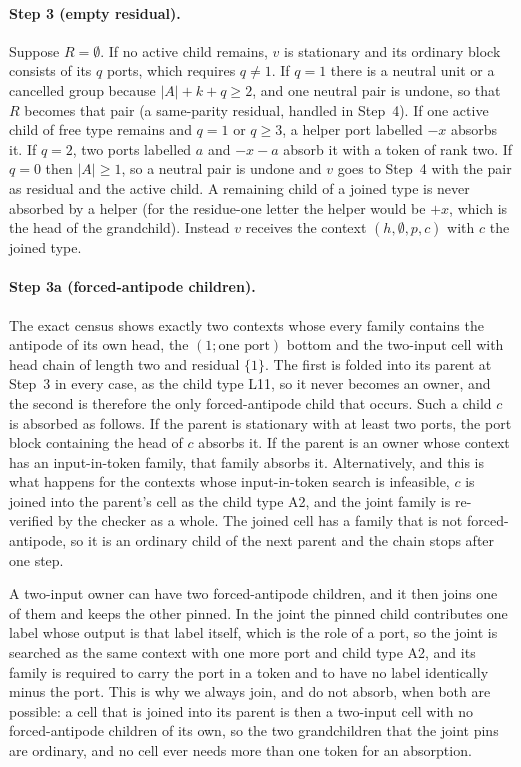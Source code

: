 \documentclass[11pt,a4paper]{article}
\theoremstyle{plain}
\theoremstyle{definition}
\theoremstyle{remark}
\begin{document}
\paragraph{Step 3 (empty residual).}
Suppose $R=\emptyset$.  If no active child remains, $v$ is stationary and its
ordinary block consists of its $q$ ports, which requires $q\ne 1$.  If $q=1$
there is a neutral unit or a cancelled group because $|A|+k+q\ge 2$, and one
neutral pair is undone, so that $R$ becomes that pair (a same-parity
residual, handled in Step~4).  If one active child of free type remains and
$q=1$ or $q\ge 3$, a helper port labelled $-x$ absorbs it.  If $q=2$, two ports
labelled $a$ and $-x-a$ absorb it with a token of rank two.  If $q=0$ then
$|A|\ge 1$, so a neutral pair is undone and $v$ goes to Step~4 with the pair as
residual and the active child.  A remaining child of a joined type is never
absorbed by a helper (for the residue-one letter the helper would be $+x$,
which is the head of the grandchild).  Instead $v$ receives the context
$(h,\emptyset,p,c)$ with $c$ the joined type.

\paragraph{Step 3a (forced-antipode children).}
The exact census shows exactly two contexts whose every family contains the
antipode of its own head, the $(1;\text{one port})$ bottom and the two-input
cell with head chain of length two and residual $\{1\}$.  The first is folded
into its parent at Step~3 in every case, as the child type L11, so it never
becomes an owner, and the second is therefore the only forced-antipode child
that occurs.  Such a child $c$ is absorbed as follows.  If the parent is
stationary with at least two ports, the port block containing the head of $c$
absorbs it.  If the parent is an owner whose context has an input-in-token
family, that family absorbs it.  Alternatively, and this is what happens for
the contexts whose input-in-token search is infeasible, $c$ is joined into the
parent's cell as the child type A2, and the joint family is re-verified by the
checker as a whole.  The joined cell has a family that is not forced-antipode, so it
is an ordinary child of the next parent and the chain stops after one step.

A two-input owner can have two forced-antipode children, and it then joins one
of them and keeps the other pinned.  In the joint the pinned child contributes
one label whose output is that label itself, which is the role of a port, so
the joint is searched as the same context with one more port and child type
A2, and its family is required to carry the port in a token and to have no
label identically minus the port.  This is why we always join, and do not absorb,
when both are possible: a cell that is joined into its parent is then
a two-input cell with no forced-antipode children of its own, so the two
grandchildren that the joint pins are ordinary, and no cell ever needs more
than one token for an absorption.
\end{document}
